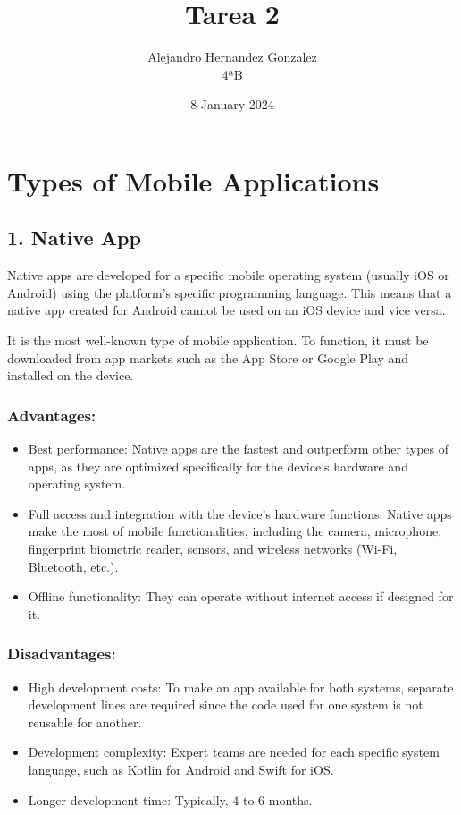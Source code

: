 \documentclass{article}
\title{Tarea 2}
\author{Alejandro Hernandez Gonzalez\\ 4ªB}
\date{8 January 2024}
\begin{document}
\maketitle

\section*{Types of Mobile Applications}

\subsection*{1. Native App}

Native apps are developed for a specific mobile operating system (usually iOS or Android) using the platform's specific programming language. This means that a native app created for Android cannot be used on an iOS device and vice versa.

It is the most well-known type of mobile application. To function, it must be downloaded from app markets such as the App Store or Google Play and installed on the device.

\subsubsection*{Advantages:}
\begin{itemize}
    \item Best performance: Native apps are the fastest and outperform other types of apps, as they are optimized specifically for the device's hardware and operating system.
    \item Full access and integration with the device's hardware functions: Native apps make the most of mobile functionalities, including the camera, microphone, fingerprint biometric reader, sensors, and wireless networks (Wi-Fi, Bluetooth, etc.).
    \item Offline functionality: They can operate without internet access if designed for it.
\end{itemize}

\subsubsection*{Disadvantages:}
\begin{itemize}
    \item High development costs: To make an app available for both systems, separate development lines are required since the code used for one system is not reusable for another.
    \item Development complexity: Expert teams are needed for each specific system language, such as Kotlin for Android and Swift for iOS.
    \item Longer development time: Typically, 4 to 6 months.
\end{itemize}
\end{document}
